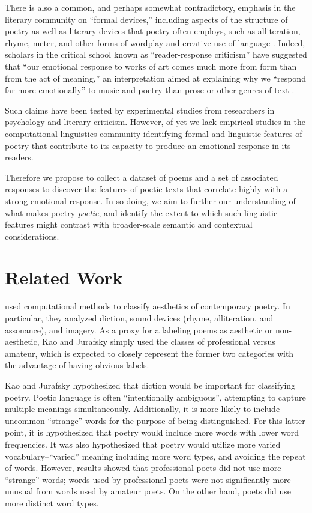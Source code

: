 \documentclass[11pt]{article}
\begin{document}
There is also a common, and perhaps somewhat contradictory, emphasis in the literary community on ``formal devices,'' including aspects of the structure of poetry as well as literary devices that poetry often employs, such as alliteration, rhyme, meter, and other forms of wordplay and creative use of language \cite{brooks1956well,packard1994poet,turco2000book}. Indeed, scholars in the critical school known as ``reader-response criticism'' have suggested that ``our emotional response to works of art comes much more from form than from the act of meaning,'' an interpretation aimed at explaining why we ``respond far more emotionally'' to music and poetry than prose or other genres of text \cite{holland1989dynamics}.

Such claims have been tested by experimental studies from researchers in psychology and literary criticism. %
 However, of yet we lack empirical studies in the computational linguistics community identifying formal and linguistic features of poetry that contribute to its capacity to produce an emotional response in its readers.

Therefore we propose to collect a dataset of poems and a set of associated responses to discover the features of poetic texts that correlate highly with a strong emotional response. In so doing, we aim to further our understanding of what makes poetry \emph{poetic}, and identify the extent to which such linguistic features might contrast with broader-scale semantic and contextual considerations.



\section{Related Work}

 used computational methods to classify aesthetics of contemporary poetry. In particular, they analyzed diction, sound devices (rhyme, alliteration, and assonance), and imagery. As a proxy for a labeling poems as aesthetic or non-aesthetic, Kao and Jurafsky simply used the classes of professional versus amateur, which is expected to closely represent the former two categories with the advantage of having obvious labels.

Kao and Jurafsky hypothesized that diction would be important for classifying poetry. Poetic language is often ``intentionally ambiguous'', attempting to capture multiple meanings simultaneously. Additionally, it is more likely to include uncommon ``strange'' words for the purpose of being distinguished. For this latter point, it is hypothesized that poetry would include more words with lower word frequencies. It was also hypothesized that poetry would utilize more varied vocabulary--``varied'' meaning including more word types, and avoiding the repeat of words. However, results showed that professional poets did not use more ``strange'' words; words used by professional poets were not significantly more unusual from words used by amateur poets. On the other hand, poets did use more distinct word types.
\end{document}

